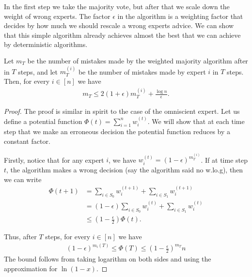 In the first step we take the majority vote, but after that we scale down the weight of wrong experts. The factor $\epsilon$ in the algorithm is a weighting factor that decides by how much we should rescale a wrong experts advice. We can show that this simple algorithm already achieves almost the best that we can achieve by deterministic algorithms.

\begin{theorem}
	Let $m_T$ be the number of mistakes made by the weighted majority algorithm after in $T$ steps, and let $m^{(i)}_T$ be the number of mistakes made by expert $i$ in $T$ steps. Then, for every $i \in [n]$ we have
	\begin{align*}
		m_T \leq 2(1+\epsilon)m^{(i)}_T + \frac{\log n}{\epsilon}.
	\end{align*}
	\label{thm:wgtd-maj}
\end{theorem}
\begin{proof}
	The proof is similar in spirit to the case of the omniscient expert. Let us define a potential function $\Phi(t) = \sum_{i=1}^n w_i^{(t)}$. We will show that at each time step that we make an erroneous decision the potential function reduces by a constant factor.
	
	Firstly, notice that for any expert $i$, we have $w_i^{(t)} = (1-\epsilon)^{m_T^{(i)}}$. If at time step $t$, the algorithm makes a wrong decision (say the algorithm said no w.lo.g), then we can write
	\begin{align*}
		\Phi(t+1) &= \sum_{i\in S_0} w_i^{(t+1)} + \sum_{i\in S_1} w_i^{(t+1)}\\
		&= (1-\epsilon)\sum_{i\in S_0} w_i^{(t)} + \sum_{i\in S_1} w_i^{(t)}\\
		&\leq \left( 1 - \frac{\epsilon}{2}\right)\Phi(t).
	\end{align*}

	Thus, after $T$ steps, for every $i\in [n]$ we have
	\begin{align*}
		(1-\epsilon)^{m_i{(T)}} \leq \Phi(T) \leq \left(1 - \frac{\epsilon}{2} \right)^{m_T}n
	\end{align*}
	The bound follows from taking logarithm on both sides and using the approximation for $\ln(1-x)$.
\end{proof}

